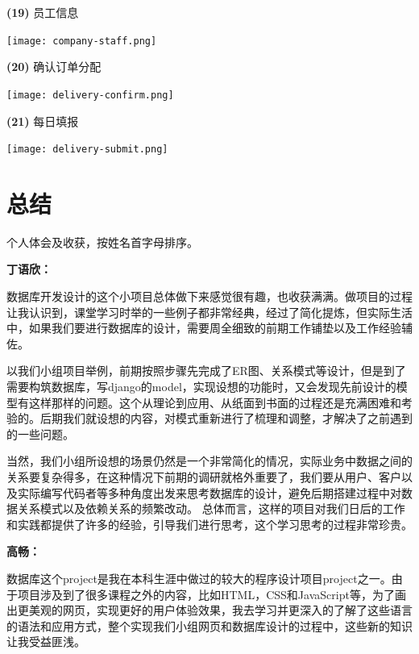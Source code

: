 \documentclass[12pt]{article}
\begin{document}
\noindent \textbf{(19)} 员工信息

\begin{center}
	\texttt{[image: company-staff.png]}
\end{center}

\noindent \textbf{(20)} 确认订单分配

\begin{center}
	\texttt{[image: delivery-confirm.png]}
\end{center}

\noindent \textbf{(21)} 每日填报

\begin{center}
	\texttt{[image: delivery-submit.png]}
\end{center}

\section{总结}
个人体会及收获，按姓名首字母排序。\par
\vspace{0.3cm}
\noindent\textbf{丁语欣：}\par 
数据库开发设计的这个小项目总体做下来感觉很有趣，也收获满满。做项目的过程让我认识到，课堂学习时举的一些例子都非常经典，经过了简化提炼，但实际生活中，如果我们要进行数据库的设计，需要周全细致的前期工作铺垫以及工作经验辅佐。

以我们小组项目举例，前期按照步骤先完成了ER图、关系模式等设计，但是到了需要构筑数据库，写django的model，实现设想的功能时，又会发现先前设计的模型有这样那样的问题。这个从理论到应用、从纸面到书面的过程还是充满困难和考验的。后期我们就设想的内容，对模式重新进行了梳理和调整，才解决了之前遇到的一些问题。

当然，我们小组所设想的场景仍然是一个非常简化的情况，实际业务中数据之间的关系要复杂得多，在这种情况下前期的调研就格外重要了，我们要从用户、客户以及实际编写代码者等多种角度出发来思考数据库的设计，避免后期搭建过程中对数据关系模式以及依赖关系的频繁改动。
总体而言，这样的项目对我们日后的工作和实践都提供了许多的经验，引导我们进行思考，这个学习思考的过程非常珍贵。

\vspace{0.3cm}
\noindent\textbf{高畅：}\par 
数据库这个project是我在本科生涯中做过的较大的程序设计项目project之一。由于项目涉及到了很多课程之外的内容，比如HTML，CSS和JavaScript等，为了画出更美观的网页，实现更好的用户体验效果，我去学习并更深入的了解了这些语言的语法和应用方式，整个实现我们小组网页和数据库设计的过程中，这些新的知识让我受益匪浅。
\end{document}
